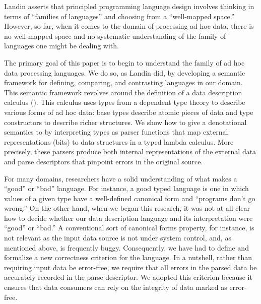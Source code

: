 Landin asserts that principled programming language design
involves thinking in terms of ``families of languages'' and
choosing from a ``well-mapped space.''  However, so far,
when it comes to the domain of processing ad hoc data, 
there is no well-mapped space and no systematic understanding
of the family of languages one might be dealing with.

The primary goal of this paper is to begin to understand the
family of ad hoc data processing languages.  We do so,
as Landin did, by developing a semantic
framework for defining, comparing, and contrasting languages
in our domain.  This semantic framework revolves around the
definition of a data description calculus (\ddc{}).  
This calculus uses types from a dependent type theory to describe
various forms of ad hoc data:
base types describe atomic pieces of data and
type constructors to describe richer structures.
We show how to give a denotational semantics
to \ddc{} by interpreting
types as parser functions that map external representations (bits)
to data structures in a typed lambda calculus.  More precisely,
these parsers produce both 
internal representations of the external data and
parse descriptors that pinpoint errors in the original source.

For many domains, researchers have a solid understanding of
what makes a ``good'' or ``bad'' language.  For instance,
a good typed language is one in which values of a given type
have a well-defined canonical form and ``programs don't go wrong.''
On the other hand, when we began this research, it
was not at all clear
how to decide whether our data description language and
its interpretation were ``good'' or ``bad.''  A conventional sort
of canonical forms property, for instance, 
is not relevant as the input data source
is not under system control, and, as
mentioned above, is frequently buggy.  Consequently,
we have had to define and formalize a new correctness criterion for the language. 
In a nutshell, rather than requiring input data be error-free, we require
that all errors in the parsed data be accurately recorded
in the parse descriptor.  We adopted this criterion because it ensures
that data consumers can rely on the integrity of data marked as error-free.


